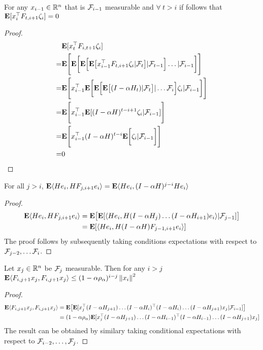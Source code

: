 \begin{lemma}\label{noisecancel}
For any $x_{i-1}\in \mathbb{R}^n$ that is $\mathcal{F}_{i-1}$ measurable and $\forall ~t > i$ if follows that $\mathbf{E}[x_i^\top F_{t,i+1}\zeta_{i}]=0$
\end{lemma}
\small
\begin{proof}
\begin{align*}
&\mathbf{E}[x_t^\top F_{i,t+1}\zeta_{i}]\\
=&\mathbf{E}\Bigg[\mathbf{E}\bigg[\mathbf{E}\Big[\mathbf{E}\big[ x_{i-1}^\top F_{t,i+1}\zeta_{i}|\mathcal{F}_{t}\big]|\mathcal{F}_{t-1}\Big]\ldots|\mathcal{F}_{i-1}\bigg]\Bigg]\\
=&\mathbf{E}\Bigg[ x_{i-1}^\top \mathbf{E}\bigg[\mathbf{E}\Big[\mathbf{E}\big[(I-\alpha H_t)|\mathcal{F}_{t}\big]|\ldots \mathcal{F}_{i}\Big]\zeta_{i}|\mathcal{F}_{i-1}\bigg]\Bigg]\\
=&\mathbf{E}\Bigg[ x_{i-1}^\top \mathbf{E}[(I-\alpha H)^{t-i+1}\zeta_{i}|\mathcal{F}_{i-1}]\Bigg]\\
=&\mathbf{E}\Bigg[ x_{i-1}^\top (I-\alpha H)^{t-i}\mathbf{E}\bigg[\zeta_{i}|\mathcal{F}_{i-1}\bigg]\Bigg]\\
=&0
\end{align*}
\end{proof}
\begin{lemma}\label{unroll}
For all $j>i$, $\mathbf{E} \langle He_i,H F_{j,i+1} e_i\rangle=\mathbf{E}\langle He_i,(I-\alpha H)^{j-i}H e_i\rangle$
\end{lemma}
\begin{proof}
\begin{align}
\mathbf{E} \langle He_i,H F_{j,i+1} e_i\rangle&=\mathbf{E}\big[ \mathbf{E}[\langle He_i,H (I-\alpha H_j)\ldots (I-\alpha H_{i+1} ) e_i\rangle|\mathcal{F}_{j-1}]\big]\\
&=\mathbf{E}[\langle He_i,H (I-\alpha H)F_{j-1,i+1} e_i\rangle]
\end{align}
The proof follows by subsequently taking conditions expectations with respect to $\mathcal{F}_{j-2},\ldots \mathcal{F}_{i}$.
\end{proof}

\begin{lemma}\label{innerproduct}
Let $x_j\in \mathbb{R}^n$ be $\mathcal{F}_j$ measurable. Then for any $i>j$ $\mathbf{E}\langle F_{i,j+1}x_j,F_{i,j+1}x_j\rangle\leq (1-\alpha \rho_\alpha)^{i-j}\left\| x_i\right\|^2$
\end{lemma}
\begin{proof}
\begin{align*}
\mathbf{E}\langle F_{i,j+1}x_j,F_{i,j+1}x_j\rangle&= \mathbf{E}\big[\mathbf{E}[x_j^\top (I-\alpha H_{j+1})\ldots (I-\alpha H_i)^\top (I-\alpha H_i)\ldots (I-\alpha H_{j+1})x_j|\mathcal{F}_{i-1}]\big]\\
&=(1-\alpha\rho_{\alpha}) \mathbf{E}[x_j^\top (I-\alpha H_{j+1})\ldots (I-\alpha H_{i-1})^\top (I-\alpha H_{i-1})\ldots (I-\alpha H_{j+1})x_j]
\end{align*}
The result can be obtained by similary taking conditional expectations with respect to $\mathcal{F}_{i-2},\ldots,\mathcal{F}_{j}$.
\end{proof}

